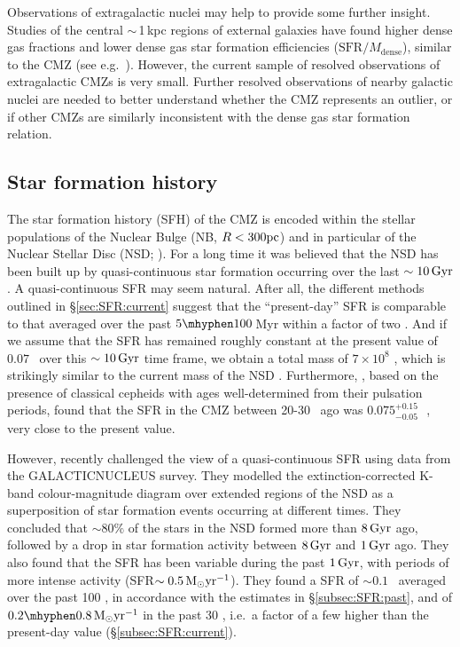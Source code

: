 Observations of extragalactic nuclei may help to provide some further insight. 
Studies of the central $\sim$\,1\,kpc regions of external galaxies have found higher dense gas fractions and lower dense gas star formation efficiencies ($\mathrm{SFR}/M_\mathrm{dense}$), similar to the CMZ (see e.g.\ \citealp{Usero2015,Bigiel2016,Jimenez-Donaire2019,Querejeta2019,Beslic2021,Eibensteiner2022}). 
However, the current sample of resolved observations of extragalactic CMZs is very small. Further resolved observations of nearby galactic nuclei are needed to better understand whether the CMZ represents an outlier, or if other CMZs are similarly inconsistent with the dense gas star formation relation.

\subsection{Star formation history}
\label{subsec:SFR:starformationhistory}

The star formation history (SFH) of the CMZ is encoded within the stellar populations of the Nuclear Bulge (NB, $R<300\mbox{${\rm pc}$}$) and in particular of the Nuclear Stellar Disc (NSD; \citealt{Launhardt2002}). 
For a long time it was believed that the NSD has been built up by quasi-continuous star formation occurring over the last $\sim 10\, \mbox{${\rm Gyr}$}$ \citep{Figer2004}. 
A quasi-continuous SFR may seem natural. 
After all, the different methods outlined in \S\ref{sec:SFR:current} suggest that the ``present-day'' SFR is comparable to that averaged over the past $5\mhyphen100$\,Myr within a factor of two \citep{Barnes2017}. 
And if we assume that the SFR has remained roughly constant at the present value of $0.07$ \msunyr \ over this $\sim 10\, \mbox{${\rm Gyr}$}$ time frame, we obtain a total mass of $7 \times 10^8$ \msun, which is strikingly similar to the current mass of the NSD \citep{Sormani2021}.
Furthermore, \citet{Matsunaga2011}, based on the presence of classical cepheids with ages well-determined from their pulsation periods, found that the SFR in the CMZ between 20-30 \myr \ ago was $0.075^{+0.15}_{-0.05}$\,\msunyr \ , very close to the present value.

However, \cite{Nogueras-Lara2020b} recently challenged the view of a quasi-continuous SFR using data from the GALACTICNUCLEUS survey. 
They modelled the extinction-corrected K-band colour-magnitude diagram over extended regions of the NSD as a superposition of star formation events occurring at different times. 
They concluded that $\sim 80 \%$ of the stars in the NSD formed more than $8\, \mbox{${\rm Gyr}$}$ ago, followed by a drop in star formation activity between $8\,\mbox{${\rm Gyr}$}$ and $1\, \mbox{${\rm Gyr}$}$ ago. 
They also found that the SFR has been variable during the past $1\, \mbox{${\rm Gyr}$}$, with periods of more intense activity (SFR$\sim 0.5\, \mbox{M$_\odot$} \mbox{${\rm yr^{-1}}$}$). They found a SFR of $\sim0.1$ \msunyr \ averaged over the past 100 \myr, in accordance with the estimates in \S\ref{subsec:SFR:past}, and of $0.2\mhyphen0.8\, \msun \peryr$ in the past 30 \myr, i.e.\ a factor of a few higher than the present-day value (\S\ref{subsec:SFR:current}).

